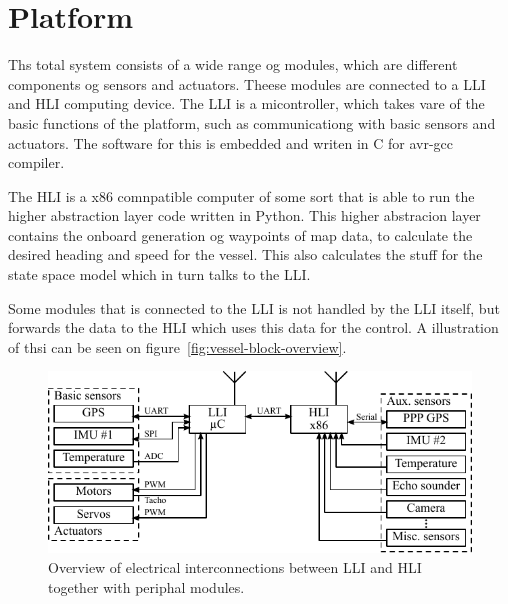 \chapter{Platform}

\noindent Ths total system consists of a wide range og modules, which are different components og sensors and actuators. Theese modules are connected to a \ac{LLI} and \ac{HLI} computing device. The \ac{LLI} is a micontroller, which takes vare of the basic functions of the platform, such as communicationg with basic sensors and actuators. The software for this is embedded and writen in C for avr-gcc compiler.

The \ac{HLI} is a x86 comnpatible computer of some sort that is able to run the higher abstraction layer code written in Python. This higher abstracion layer contains the onboard generation og waypoints of map data, to calculate the desired heading and speed for the vessel. This also calculates the stuff for the state space model which in turn talks to the \ac{LLI}.

Some modules that is connected to the \ac{LLI} is not handled by the \ac{LLI} itself, but forwards the data to the \ac{HLI} which uses this data for the control. A illustration of thsi can be seen on figure~\vref{fig:vessel-block-overview}.


\begin{figure}[htbp]
	\centering
	\includegraphics[width=\textwidth]{img/vessel-block-overview-electrical}
	\caption{Overview of electrical interconnections between \ac{LLI} and \ac{HLI} together with periphal modules.}
	\label{fig:vessel-block-overview-electrical}
\end{figure}
